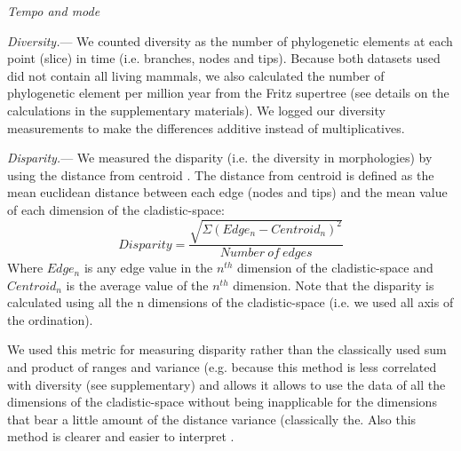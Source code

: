 \documentclass[12pt,letterpaper]{article}
\renewcommand{\subsection}[1]{%
\bigskip
\begin{center}
\begin{large}
\normalfont\itshape #1
\end{large}
\end{center}}
\renewcommand{\subsubsection}[1]{%
\vspace{2ex}
\noindent
\textit{#1.}---}
\begin{document}
\subsection{Tempo and mode}
\subsubsection{Diversity}
We counted diversity as the number of phylogenetic elements at each point (slice) in time (i.e. branches, nodes and tips). Because both datasets used did not contain all living mammals, we also calculated the number of phylogenetic element per million year from the Fritz supertree \cite{fritzdiversity2013} (see details on the calculations in the supplementary materials). We logged our diversity measurements to make the differences additive instead of multiplicatives.

\subsubsection{Disparity}
We measured the disparity (i.e. the diversity in morphologies) by using the distance from centroid \cite{finlay2015morphological}. The distance from centroid is defined as the mean euclidean distance between each edge (nodes and tips) and the mean value of each dimension of the cladistic-space:
\begin{equation}
Disparity=\frac{\sqrt{\Sigma(Edge_{n}-Centroid_{n})^2}}{Number\ of\ edges}
\end{equation}
Where $Edge_{n}$ is any edge value in the $n^{th}$ dimension of the cladistic-space and $Centroid_{n}$ is the average value of the $n^{th}$ dimension. Note that the disparity is calculated using all the n dimensions of the cladistic-space (i.e. we used all axis of the ordination).

We used this metric for measuring disparity rather than the classically used sum and product of ranges and variance (e.g. \cite{Wills1994,Foote29111996,Wesley-Hunt2005,Brusatte12092008,ruta2013} %
because this method is less correlated with diversity (see supplementary) and allows it allows to use the data of all the dimensions of the cladistic-space without being inapplicable for the dimensions that bear a little amount of the distance variance (classically the. Also this method is clearer and easier to interpret \cite{finlay2015morphological}.
\end{document}
